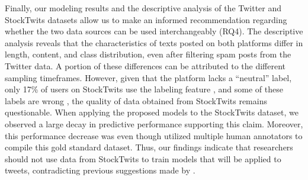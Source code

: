 Finally, our modeling results and the descriptive analysis of the Twitter and StockTwits datasets allow us to make an informed recommendation regarding whether the two data sources can be used interchangeably (RQ4). The descriptive analysis reveals that the characteristics of texts posted on both platforms differ in length, content, and class distribution, even after filtering spam posts from the Twitter data. A portion of these differences can be attributed to the different sampling timeframes. However, given that the platform lacks a ``neutral'' label, only 17\% of users on StockTwits use the labeling feature , and some of these labels are wrong , the quality of data obtained from StockTwits remains questionable. When applying the proposed models to the StockTwits dataset, we observed a large decay in predictive performance supporting this claim. Moreover, this performance decrease was even though  utilized multiple human annotators to compile this gold standard dataset. Thus, our findings indicate that researchers should not use data from StockTwits to train models that will be applied to tweets, contradicting previous suggestions made by .

